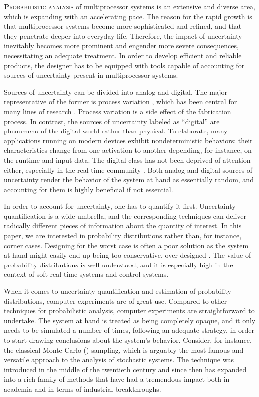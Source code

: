 \lettrine[findent=0.4em, nindent=0em]{\textbf{P}}{robabilistic analysis} of
multiprocessor systems is an extensive and diverse area, which is expanding with
an accelerating pace. The reason for the rapid growth is that multiprocessor
systems become more sophisticated and refined, and that they penetrate deeper
into everyday life. Therefore, the impact of uncertainty inevitably becomes more
prominent and engender more severe consequences, necessitating an adequate
treatment. In order to develop efficient and reliable products, the designer has
to be equipped with tools capable of accounting for sources of uncertainty
present in multiprocessor systems.

Sources of uncertainty can be divided into analog and digital. The major
representative of the former is process variation \cite{srivastava2005}, which
has been central for many lines of research \cite{bhardwaj2008, juan2012,
lee2013, ukhov2014, ukhov2015}. Process variation is a side effect of the
fabrication process. In contrast, the sources of uncertainty labeled as
``digital'' are phenomena of the digital world rather than physical. To
elaborate, many applications running on modern devices exhibit nondeterministic
behaviors: their characteristics change from one activation to another
depending, for instance, on the runtime and input data. The digital class has
not been deprived of attention either, especially in the real-time community
\cite{diaz2002, quinton2012, tanasa2015}. Both analog and digital sources of
uncertainty render the behavior of the system at hand as essentially random, and
accounting for them is highly beneficial if not essential.

In order to account for uncertainty, one has to quantify it first. Uncertainty
quantification is a wide umbrella, and the corresponding techniques can deliver
radically different pieces of information about the quantity of interest. In
this paper, we are interested in probability distributions rather than, for
instance, corner cases. Designing for the worst case is often a poor solution as
the system at hand might easily end up being too conservative, over-designed
\cite{quinton2012}. The value of probability distributions is well understood,
and it is especially high in the context of soft real-time systems and control
systems.

When it comes to uncertainty quantification and estimation of probability
distributions, computer experiments \cite{santner2003} are of great use.
Compared to other techniques for probabilistic analysis, computer experiments
are straightforward to undertake. The system at hand is treated as being
completely opaque, and it only needs to be simulated a number of times,
following an adequate strategy, in order to start drawing conclusions about the
system's behavior. Consider, for instance, the classical Monte Carlo ()
sampling, which is arguably the most famous and versatile approach to the
analysis of stochastic systems. The technique was introduced in the middle of
the twentieth century and since then has expanded into a rich family of methods
that have had a tremendous impact both in academia and in terms of industrial
breakthroughs.

